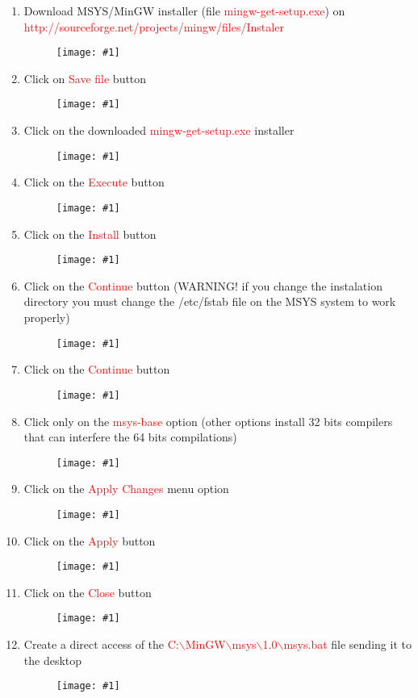 \documentclass[a4paper]{article}
\newcommand{\FIGURE}[1]
{
	\begin{figure}[!ht]
	\centering
	\texttt{[image: \#1]}
	\end{figure}
}
\newcommand{\RED}[1] {\textcolor{red}{#1}}
\begin{document}
\begin{enumerate}

\item Download MSYS/MinGW installer (file \RED{mingw-get-setup.exe}) on \newline
\RED{http://sourceforge.net/projects/mingw/files/Instaler}

\FIGURE{msys-1.png.eps}

\clearpage

\item Click on \RED{Save file} button
\FIGURE{msys-2.png.eps}

\item Click on the downloaded \RED{mingw-get-setup.exe} installer
\FIGURE{msys-3.png.eps}

\clearpage

\item Click on the \RED{Execute} button
\FIGURE{msys-4.png.eps}

\item Click on the \RED{Install} button
\FIGURE{msys-5.png.eps}

\clearpage

\item Click on the \RED{Continue} button (WARNING! if you change the instalation
directory you must change the /etc/fstab file on the MSYS system to work
properly)
\FIGURE{msys-6.png.eps}

\item Click on the \RED{Continue} button
\FIGURE{msys-7.png.eps}

\clearpage

\item Click only on the \RED{msys-base} option (other options install 32 bits
compilers that can interfere the 64 bits compilations)
\FIGURE{msys-8.png.eps}

\item Click on the \RED{Apply Changes} menu option
\FIGURE{msys-9.png.eps}

\clearpage

\item Click on the \RED{Apply} button
\FIGURE{msys-10.png.eps}

\item Click on the \RED{Close} button
\FIGURE{msys-11.png.eps}

\clearpage

\item Create a direct access of the
\RED{C:$\backslash$MinGW$\backslash$msys$\backslash$1.0$\backslash$msys.bat}
file sending it to the desktop
\FIGURE{msys-12.png.eps}


\end{enumerate}
\end{document}
